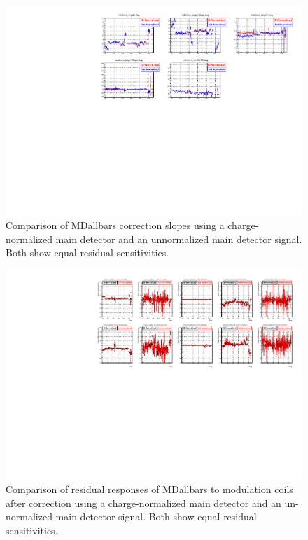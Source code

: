 \begin{landscape}
\begin{figure}[!ht]
\begin{center}
\includegraphics[width=9in]{./Pictures/NoQnorm_slopes.pdf}
\caption{\label{fig:no_Q_norm_slopes}Comparison of MDallbars correction slopes using a charge-normalized main detector and an unnormalized main detector signal. Both show equal residual sensitivities.}
\end{center}
\end{figure}


\begin{figure}[!ht]
\begin{center}
\includegraphics[width=8.9in]{./Pictures/NoQnorm_residuals.pdf}
\caption{\label{fig:no_Q_norm_residuals}Comparison of residual responses of MDallbars to modulation coils after correction using a charge-normalized main detector and an un-normalized main detector signal. Both show equal residual sensitivities.}
\end{center}
\end{figure}
\end{landscape}

